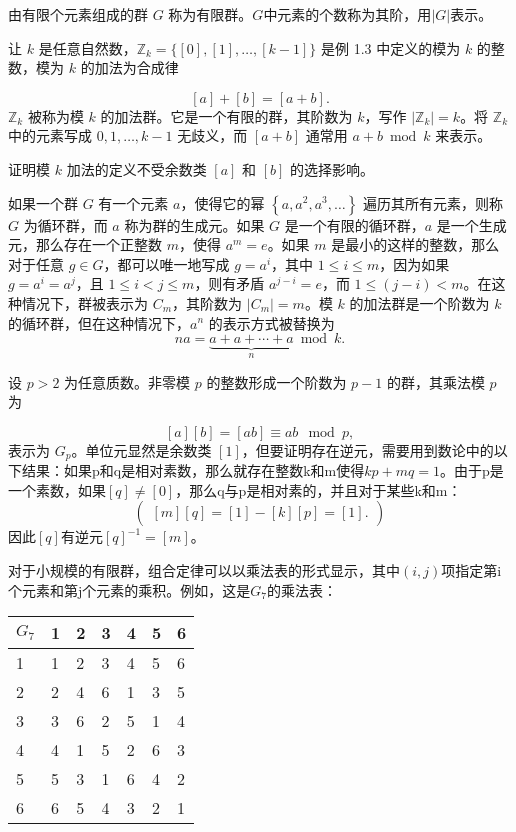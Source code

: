 由有限个元素组成的群 $G$ 称为有限群。$G$中元素的个数称为其阶，用$|G|$表示。
\begin{eg}
    让 $k$ 是任意自然数，$\mathbb{Z}_k=\{[0],[1],\ldots,[k-1]\}$ 是例 1.3 中定义的模为 $k$ 的整数，模为 $k$ 的加法为合成律

$$
[a]+[b]=[a+b] .
$$
$\mathbb{Z}_k$ 被称为模 $k$ 的加法群。它是一个有限的群，其阶数为 $k$，写作 $\left|\mathbb{Z}_k\right|=k$。将 $\mathbb{Z}_k$ 中的元素写成 $0,1, \ldots, k-1$ 无歧义，而 $[a+b]$ 通常用 $a+b \bmod k$ 来表示。
\end{eg}
\begin{exercise}
    证明模 $k$ 加法的定义不受余数类 $[a]$ 和 $[b]$ 的选择影响。
\end{exercise}
\begin{eg}
 如果一个群 $G$ 有一个元素 $a$，使得它的幂 $\left\{a, a^2, a^3, \ldots\right\}$ 遍历其所有元素，则称 $G$ 为循环群，而 $a$ 称为群的生成元。如果 $G$ 是一个有限的循环群，$a$ 是一个生成元，那么存在一个正整数 $m$，使得 $a^m=e$。如果 $m$ 是最小的这样的整数，那么对于任意 $g \in G$，都可以唯一地写成 $g=a^i$，其中 $1 \leq i \leq m$，因为如果 $g=a^i=a^j$，且 $1 \leq i<j \leq m$，则有矛盾 $a^{j-i}=e$，而 $1 \leq(j-i)<m$。在这种情况下，群被表示为 $C_m$，其阶数为 $\left|C_m\right|=m$。模 $k$ 的加法群是一个阶数为 $k$ 的循环群，但在这种情况下，$a^n$ 的表示方式被替换为
$$
n a=\underbrace{a+a+\cdots+a}_{n} \bmod k .
$$ 
\end{eg}
\begin{eg}
    设 $p>2$ 为任意质数。非零模 $p$ 的整数形成一个阶数为 $p-1$ 的群，其乘法模 $p$ 为

$$
[a][b]=[ab]\equiv ab\mod p,
$$
表示为 $G_p$。单位元显然是余数类 $[1]$，但要证明存在逆元，需要用到数论中的以下结果：如果p和q是相对素数，那么就存在整数k和m使得$k p+m q=1$。由于p是一个素数，如果$[q] \neq[0]$，那么q与p是相对素的，并且对于某些k和m：
$$
\begin{pmatrix}
[m][q]=[1]-[k][p]=[1] .
\end{pmatrix}
$$
因此$[q]$有逆元$[q]^{-1}=[m]$。
\end{eg} 
对于小规模的有限群，组合定律可以以乘法表的形式显示，其中$(i, j)$项指定第i个元素和第j个元素的乘积。例如，这是$G_7$的乘法表：

\begin{tabular}{l|llllll}
$G_7$ & 1 & 2 & 3 & 4 & 5 & 6 \\
\hline 1 & 1 & 2 & 3 & 4 & 5 & 6 \\
2 & 2 & 4 & 6 & 1 & 3 & 5 \\
3 & 3 & 6 & 2 & 5 & 1 & 4 \\
4 & 4 & 1 & 5 & 2 & 6 & 3 \\
5 & 5 & 3 & 1 & 6 & 4 & 2 \\
6 & 6 & 5 & 4 & 3 & 2 & 1
\end{tabular}
